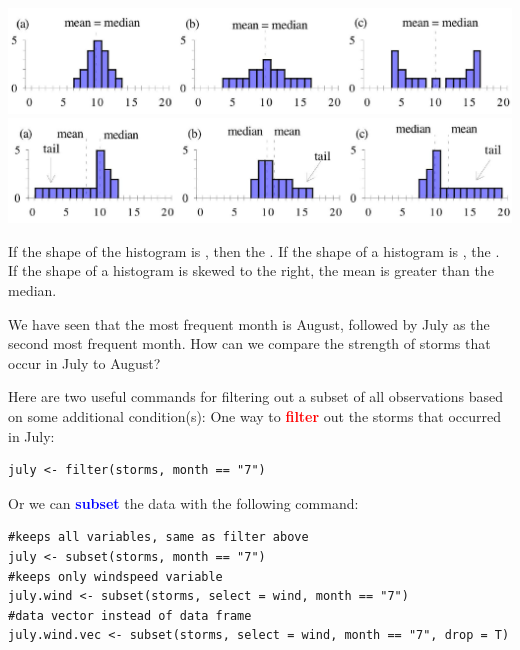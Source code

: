 \ee


\bbox
\begin{center}
\includegraphics[width=0.75\tw]{02/fig-symmetric.png} \\
\includegraphics[width=0.75\tw]{02/fig-skewed.png} 
\end{center}

\bi
\ii If the shape of the histogram is \textbf{}, then the \textbf{}.
\ii If the shape of a histogram is \textbf{}, the \textbf{}.
\ii If the shape of a histogram is \alert{skewed to the right}, the \alert{mean is greater than the median}.
\ei
\ebox


We have seen that the most frequent month is August, followed by July as the second most frequent month. How can we compare the strength of storms that occur in July to August?

\bbox
Here are two useful commands for filtering out a subset of all observations based on some additional condition(s):
\bi
\ii One way to  \textbf{\textcolor{red}{filter}} out the storms that occurred in July:

\begin{lstlisting}
july <- filter(storms, month == "7")
\end{lstlisting}


\ii Or we can \textbf{\textcolor{blue}{subset}} the data with the following command:

\begin{lstlisting}
#keeps all variables, same as filter above
july <- subset(storms, month == "7")
#keeps only windspeed variable
july.wind <- subset(storms, select = wind, month == "7")
#data vector instead of data frame
july.wind.vec <- subset(storms, select = wind, month == "7", drop = T) 
\end{lstlisting}

